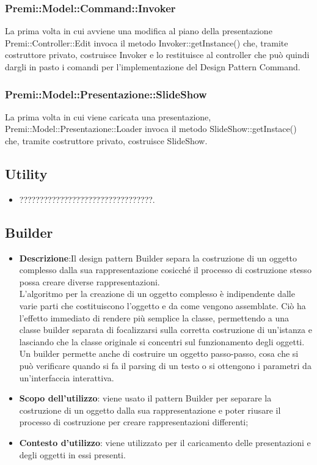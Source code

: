 {{			\subsubsection{Premi::Model::Command::Invoker}{
				La prima volta in cui avviene una modifica al piano della presentazione Premi::Controller::Edit invoca il metodo Invoker::getInstance() che, tramite costruttore privato, costruisce Invoker e lo restituisce al controller che può quindi dargli in pasto i comandi per l'implementazione del Design Pattern Command.
			}
			\subsubsection{Premi::Model::Presentazione::SlideShow}{
							La prima volta in cui viene caricata una presentazione, Premi::Model::Presentazione::Loader invoca il metodo SlideShow::getInstace() che, tramite costruttore privato, costruisce SlideShow.
						}
		
	}
	\subsection{Utility}{
		\begin{itemize}
			\item ?????????????????????????????????.
		\end{itemize}
	}
	\subsection{Builder}{
		\begin{itemize}
			\item \textbf{Descrizione}:Il design pattern Builder separa la costruzione di un oggetto complesso dalla sua rappresentazione cosicché il processo di costruzione stesso possa creare diverse rappresentazioni.\\			
			L'algoritmo per la creazione di un oggetto complesso è indipendente dalle varie parti che costituiscono l'oggetto e da come vengono assemblate.	Ciò ha l'effetto immediato di rendere più semplice la classe, permettendo a una classe builder separata di focalizzarsi sulla corretta costruzione di un'istanza e lasciando che la classe originale si concentri sul funzionamento degli oggetti. Un builder permette anche di costruire un oggetto passo-passo, cosa che si può verificare quando si fa il parsing di un testo o si ottengono i parametri da un'interfaccia interattiva.
			\item \textbf{Scopo dell’utilizzo}: viene usato il pattern Builder per separare la costruzione di un oggetto dalla sua rappresentazione e poter riusare il processo di costruzione per creare rappresentazioni differenti;
			\item \textbf{Contesto d’utilizzo}: viene utilizzato per il caricamento delle presentazioni e degli oggetti in essi presenti.
		\end{itemize}
}}
